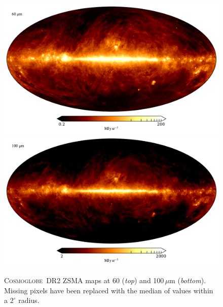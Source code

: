 \documentclass{aa}
\newcommand{\cosmoglobe}{\textsc{Cosmoglobe}}
\begin{document}
\begin{figure}
	\centering
	\includegraphics[width=\linewidth]{figs/map_07.pdf}\\
	\includegraphics[width=\linewidth]{figs/map_08.pdf}
	\caption{\cosmoglobe\ DR2 ZSMA maps at 60 (\emph{top}) and
          100$\,\mu$m (\emph{bottom}). Missing pixels have been replaced with
          the median of values within a $2^\circ$ radius.}
	\label{fig:freqmaps7_8}
\end{figure}
\end{document}
